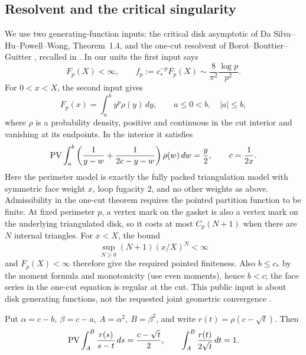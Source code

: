 \subsection{Resolvent and the critical singularity}\label{disk:resolvent}

We use two generating-function inputs: the critical disk asymptotic of
Da Silva--Hu--Powell--Wong, Theorem~1.4, and the one-cut resolvent of
Borot--Bouttier--Guitter \citep[Sections~6.1--6.3]{BBGBending}, recalled in
\citep[Equations~(2.20)--(2.23) and~(3.4)--(3.5)]{DSHPW}.
In our units the first input says
\[
 F_p(X)<\infty,\qquad
 f_p:=c_*^{-p}F_p(X)\sim\frac8{\pi^2}\frac{\log p}{p^2}.
\]
For $0<x<X$, the second input gives
\[
 F_p(x)=\int_a^b y^p\rho(y)\,dy,
 \qquad a\leq0<b,\quad |a|\leq b,
\]
where $\rho$ is a probability density, positive and continuous in the cut
interior and vanishing at its endpoints.  In the interior it satisfies
\[
 {\rm PV}\int_a^b\left(\frac1{y-w}+\frac1{2c-y-w}\right)\rho(w)\,dw=\frac{y}{2},\qquad c=\frac1{2x}.
\]
Here the perimeter model is exactly the fully packed triangulation model with symmetric face weight \(x\), loop fugacity \(2\), and no other weights as above.
Admissibility in the one-cut theorem requires the pointed partition function to be finite.  At fixed perimeter \(p\), a vertex mark on the gasket is also a vertex mark on the underlying triangulated disk, so it costs at most \(C_p(N+1)\) when there are \(N\) internal triangles.  For \(x<X\), the bound
\[
 \sup_{N\ge0}(N+1)(x/X)^N<\infty
\]
and \(F_p(X)<\infty\) therefore give the required pointed finiteness.
Also \(b\le c_*\) by the moment formula and monotonicity (use even moments), hence \(b<c\); the face series in the one-cut equation is regular at the cut.
This public input is about disk generating functions, not the requested joint geometric convergence \citep[Theorem~1.4 and Sections~2.4--3.1]{DSHPW}.

Put \(\alpha=c-b,\ \beta=c-a,\ A=\alpha^2,\ B=\beta^2\), and write \(r(t)=\rho(c-\sqrt t)\).
Then
\[
 {\rm PV}\int_A^B\frac{r(s)}{s-t}\,ds=\frac{c-\sqrt t}{2},\qquad
 \int_A^B\frac{r(t)}{2\sqrt t}\,dt=1.
\]

